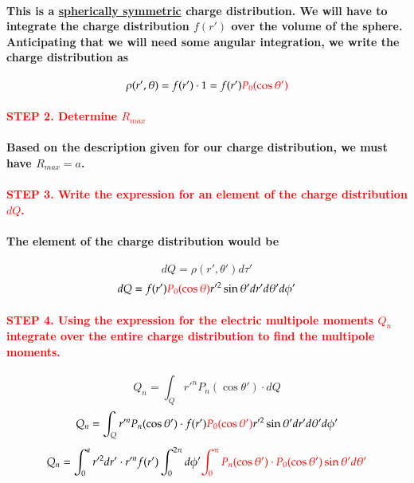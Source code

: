 \documentclass{article}
\begin{document}
\paragraph{\indent This is a \underline{spherically symmetric} charge distribution. We will have to integrate the charge distribution $f(r')$ over the volume of the sphere. Anticipating that we will need some angular integration, we write the charge distribution as}
\begin{equation*}
    \rho(r',\theta)=f(r')\cdot 1=f(r')\textcolor{red}{P_0(\cos\theta')}
\end{equation*}
\paragraph{\textcolor{red}{STEP 2. Determine $R_{max}$}}
\paragraph{\indent Based on the description given for our charge distribution, we must have $R_{max}=a$.}
\paragraph{\textcolor{red}{STEP 3. Write the expression for an element of the charge distribution $dQ$.}}
\paragraph{\indent The element of the charge distribution would be}
\begin{equation*}
    dQ=\rho(r',\theta')d\tau'
\end{equation*}
\begin{equation*}
    dQ=f(r')\textcolor{red}{P_0(\cos\theta)}r'^2\sin\theta'dr'd\theta'd\phi'
\end{equation*}
\paragraph{\textcolor{red}{STEP 4. Using the expression for the electric multipole moments $Q_n$ integrate over the entire charge distribution to find the multipole moments.}}
\begin{equation*}
    Q_n=\int_Q r'^n P_n (\cos\theta')\cdot dQ
\end{equation*}
\begin{equation*}
    Q_n=\int_Q r'^nP_n(\cos\theta')\cdot f(r')\textcolor{red}{P_0(\cos\theta')}r'^2\sin\theta'dr'd\theta'd\phi'
\end{equation*}
\begin{equation*}
    Q_n=\int_0^a r'^2dr'\cdot r'^n f(r')\int_0^{2\pi}d\phi'\textcolor{red}{\int_0^{\pi} P_n(\cos\theta')\cdot P_0(\cos\theta')\sin\theta'd\theta'}
\end{equation*}
\end{document}
